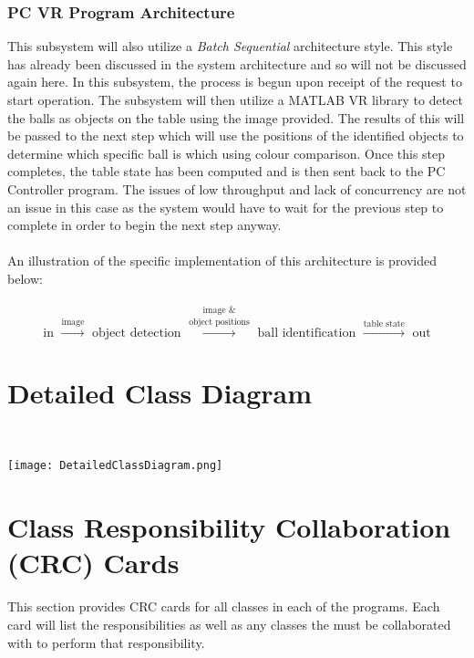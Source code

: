 \documentclass[titlepage]{article}
\begin{document}
\subsubsection{PC VR Program Architecture}
This subsystem will also utilize a \textit{Batch Sequential} architecture style. This style has already been discussed in the system architecture and so will not be discussed again here. In this subsystem, the process is begun upon receipt of the request to start operation. The subsystem will then utilize a MATLAB VR library to detect the balls as objects on the table using the image provided. The results of this will be passed to the next step which will use the positions of the identified objects to determine which specific ball is which using colour comparison. Once this step completes, the table state has been computed and is then sent back to the PC Controller program. The issues of low throughput and lack of concurrency are not an issue in this case as the system would have to wait for the previous step to complete in order to begin the next step anyway.\\~\\

An illustration of the specific implementation of this architecture is provided below:\\~\\
$$\text{in } \xrightarrow{\text{image}} \text{ object detection } \overset{\text{image \&}}{\xrightarrow{\text{object positions}}} \text{ ball identification } \xrightarrow{\text{table state}} \text{ out}$$
\label{fig:PC VR Architecture}



\section{Detailed Class Diagram}~\\
\begin{sidewaysfigure}
	\begin{center}
		\texttt{[image: DetailedClassDiagram.png]}
	\label{fig:detailedClassDiagram}
	\end{center}
\end{sidewaysfigure}
\newpage



\section{Class Responsibility Collaboration (CRC) Cards}
This section provides CRC cards for all classes in each of the programs. Each card will list the responsibilities as well as any classes the must be collaborated with to perform that responsibility.
\end{document}
